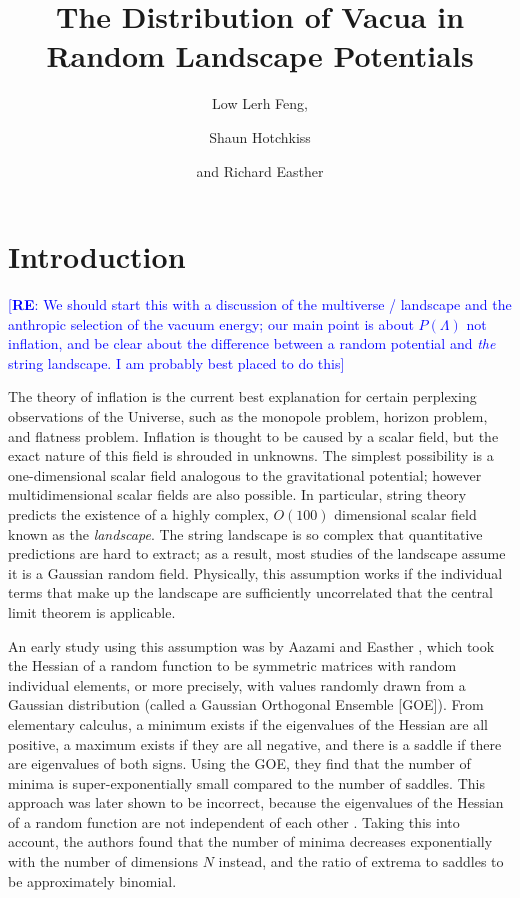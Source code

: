 \documentclass[12pt]{article}
\title{The Distribution of Vacua in Random Landscape Potentials}
\author{Low Lerh Feng,}
\author{Shaun Hotchkiss}
\author{and Richard Easther}
\affiliation{Department of Physics,\\ University of Auckland, \\Private Bag 92019,\\ Auckland, New Zealand}
\newcommand{\re}[1]{\textcolor{blue}{[{\bf RE}: #1]}}
\begin{document}
\maketitle

\section{Introduction}

\re{We should start this with a discussion of the multiverse / landscape and the anthropic selection of the vacuum energy; our main point is about $P(\Lambda)$ not inflation, and be clear about the difference between a random potential and {\em the} string landscape. I am probably best placed to do this} 

The theory of inflation is the current best explanation for certain perplexing observations of the Universe, such as the monopole problem, horizon problem, and flatness problem. Inflation is thought to be caused by a scalar field, but the exact nature of this field is shrouded in unknowns. The simplest possibility is a one-dimensional scalar field analogous to the gravitational potential; however multidimensional scalar fields are also possible. In particular, string theory predicts the existence of a highly complex, $O(100)$ dimensional scalar field known as the \emph{landscape}. The string landscape is so complex that quantitative predictions are hard to extract; as a result, most studies of the landscape assume it is a Gaussian random field.\cite{GRF1, GRF2, GRF3} Physically, this assumption works if the individual terms that make up the landscape are sufficiently uncorrelated that the central limit theorem is applicable.

An early study using this assumption was by Aazami and Easther \cite{Aazami2006}, which took the Hessian of a random function to be symmetric matrices with random individual elements, or more precisely, with values randomly drawn from a Gaussian distribution (called a Gaussian Orthogonal Ensemble [GOE]). From elementary calculus, a minimum exists if the eigenvalues of the Hessian are all positive, a maximum exists if they are all negative, and there is a saddle if there are eigenvalues of both signs. Using the GOE, they find that the number of minima is super-exponentially small compared to the number of saddles. This approach was later shown to be incorrect, because the eigenvalues of the Hessian of a random function are not independent of each other \cite{Easther2016}. Taking this into account, the authors found that the number of minima decreases exponentially with the number of dimensions $N$ instead, and the ratio of extrema to saddles to be approximately binomial.
\end{document}
